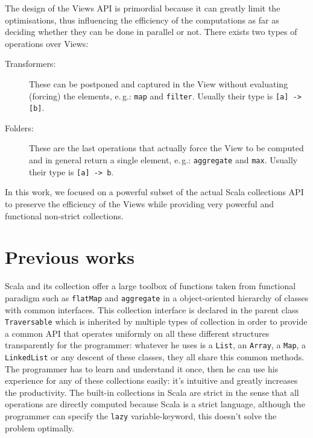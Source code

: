 \documentclass[a4paper,12pt,twocolumn]{article}
\newcommand{\eg}{e.\,g.}
\begin{document}
The design of the Views API is primordial because it can greatly limit the optimisations, thus influencing the efficiency of the computations as far as deciding whether they can be done in parallel or not.
There exists two types of operations over Views:
\begin{description}
    \item[Transformers:] These can be postponed and captured in the View without evaluating (forcing) the elements, \eg: \verb|map| and \verb|filter|. Usually their type is \verb|[a] -> [b]|.
    \item[Folders:] These are the last operations that actually force the View to be computed and in general return a single element, \eg: \verb|aggregate| and \verb|max|. Usually their type is \verb|[a] -> b|.
\end{description}
In this work, we focused on a powerful subset of the actual Scala collections API to preserve the efficiency of the Views while providing very powerful and functional non-strict collections.

\section{Previous works}
Scala and its collection offer a large toolbox of functions taken from functional paradigm such as \verb|flatMap| and \verb|aggregate| in a object-oriented hierarchy of classes with common interfaces.
This collection interface is declared in the parent class \verb|Traversable|\cite{scala-collections} which is inherited by multiple types of collection in order to provide a common API that operates uniformly on all these different structures transparently for the programmer: whatever he uses is a \verb|List|, an \verb|Array|, a \verb|Map|, a \verb|LinkedList| or any descent of these classes, they all share this common methods.
The programmer has to learn and understand it once, then he can use his experience for any of these collections easily: it's intuitive and greatly increases the productivity.
The built-in collections in Scala are strict in the sense that all operations are directly computed because Scala is a strict language, although the programmer can specify the \verb|lazy| variable-keyword, this doesn't solve the problem optimally.
\end{document}

